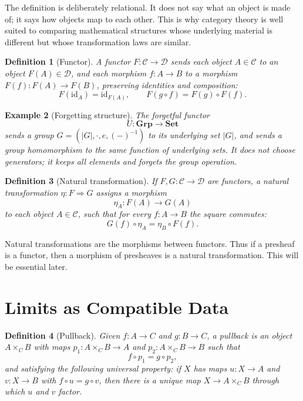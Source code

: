 \documentclass[11pt]{article}
\newtheorem{definition}{Definition}[section]
\newtheorem{example}[definition]{Example}
\newcommand{\Set}{\mathbf{Set}}
\newcommand{\Grp}{\mathbf{Grp}}
\newcommand{\id}{\mathrm{id}}
\begin{document}
The definition is deliberately relational. It does not say what an object is
made of; it says how objects map to each other. This is why category theory is
well suited to comparing mathematical structures whose underlying material is
different but whose transformation laws are similar.

\begin{definition}[Functor]
A functor \(F:\mathcal C\to\mathcal D\) sends each object
\(A\in\mathcal C\) to an object \(F(A)\in\mathcal D\), and each morphism
\(f:A\to B\) to a morphism \(F(f):F(A)\to F(B)\), preserving identities and
composition:
\[
F(\id_A)=\id_{F(A)},\qquad
F(g\circ f)=F(g)\circ F(f).
\]
\end{definition}

\begin{example}[Forgetting structure]
The forgetful functor
\[
U:\Grp\longrightarrow \Set
\]
sends a group \(G=(|G|,\cdot,e,(-)^{-1})\) to its underlying set \(|G|\), and
sends a group homomorphism to the same function of underlying sets. It does not
choose generators; it keeps all elements and forgets the group operation.
\end{example}

\begin{definition}[Natural transformation]
If \(F,G:\mathcal C\to\mathcal D\) are functors, a natural transformation
\(\eta:F\Rightarrow G\) assigns a morphism
\[
\eta_A:F(A)\to G(A)
\]
to each object \(A\in\mathcal C\), such that for every \(f:A\to B\) the square
commutes:
\[
G(f)\circ \eta_A=\eta_B\circ F(f).
\]
\end{definition}

Natural transformations are the morphisms between functors. Thus if a presheaf
is a functor, then a morphism of presheaves is a natural transformation. This
will be essential later.

\section{Limits as Compatible Data}

\begin{definition}[Pullback]
Given \(f:A\to C\) and \(g:B\to C\), a pullback is an object
\(A\times_C B\) with maps \(p_1:A\times_C B\to A\) and
\(p_2:A\times_C B\to B\) such that
\[
f\circ p_1=g\circ p_2,
\]
and satisfying the following universal property: if \(X\) has maps
\(u:X\to A\) and \(v:X\to B\) with \(f\circ u=g\circ v\), then there is a
unique map \(X\to A\times_C B\) through which \(u\) and \(v\) factor.
\end{definition}
\end{document}
